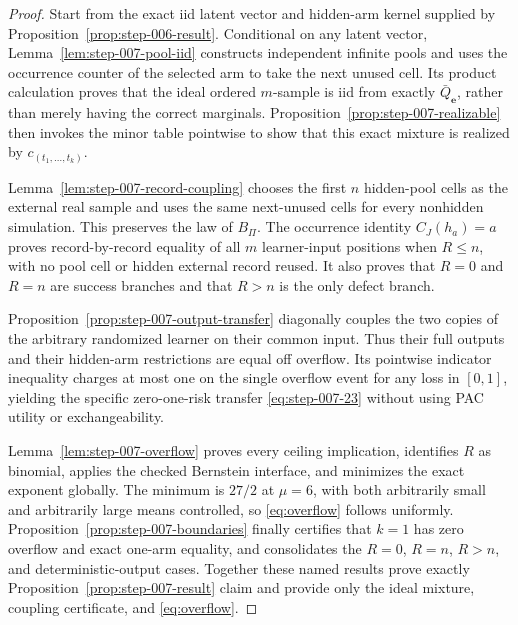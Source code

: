 \begin{proof}

Start from the exact iid latent vector and hidden-arm kernel supplied
by Proposition~\ref{prop:step-006-result}.  Conditional on any
latent vector, Lemma~\ref{lem:step-007-pool-iid} constructs independent
infinite pools and uses the occurrence counter of the selected arm to
take the next unused cell.  Its product calculation proves that the
ideal ordered \(m\)-sample is iid from exactly
\(\bar Q_{\mathbf e}\), rather than merely having the correct
marginals.  Proposition~\ref{prop:step-007-realizable} then invokes
the minor table pointwise to show that this exact mixture is realized
by \(c_{(t_1,\ldots,t_k)}\).

Lemma~\ref{lem:step-007-record-coupling} chooses the first \(n\)
hidden-pool cells as the external real sample and uses the same
next-unused cells for every nonhidden simulation.  This preserves the
law of \(B_\Pi\).  The occurrence identity \(C_J(h_a)=a\) proves
record-by-record equality of all \(m\) learner-input positions when
\(R\le n\), with no pool cell or hidden external record reused.  It
also proves that \(R=0\) and \(R=n\) are success branches and that
\(R>n\) is the only defect branch.

Proposition~\ref{prop:step-007-output-transfer} diagonally couples the
two copies of the arbitrary randomized learner on their common input.
Thus their full outputs and their hidden-arm restrictions are equal
off overflow.  Its pointwise indicator inequality charges at most one
on the single overflow event for any loss in \([0,1]\), yielding the
specific zero-one-risk transfer \eqref{eq:step-007-23} without using PAC utility or
exchangeability.

Lemma~\ref{lem:step-007-overflow} proves every ceiling implication,
identifies \(R\) as binomial, applies the checked Bernstein interface,
and minimizes the exact exponent globally.  The minimum is
\(27/2\) at \(\mu=6\), with both arbitrarily small and arbitrarily
large means controlled, so \eqref{eq:overflow} follows uniformly.
Proposition~\ref{prop:step-007-boundaries} finally certifies that
\(k=1\) has zero overflow and exact one-arm equality, and consolidates
the \(R=0\), \(R=n\), \(R>n\), and deterministic-output cases.
Together these named results prove exactly Proposition~\ref{prop:step-007-result}
claim and provide only the ideal mixture, coupling certificate, and
\eqref{eq:overflow}.

\end{proof}

